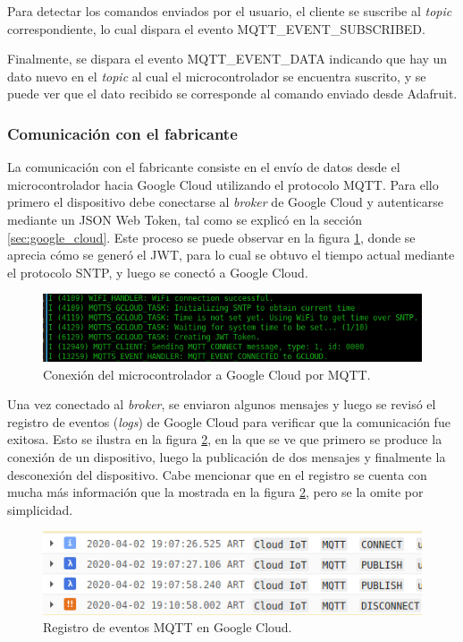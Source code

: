 Para detectar los comandos enviados por el usuario, el cliente se suscribe al \emph{topic} correspondiente, lo cual dispara el evento MQTT\_EVENT\_SUBSCRIBED.

Finalmente, se dispara el evento MQTT\_EVENT\_DATA indicando que hay un dato nuevo en el \emph{topic} al cual el microcontrolador se encuentra suscrito, y se puede ver que el dato recibido se corresponde al comando enviado desde Adafruit.

\subsubsection{Comunicación con el fabricante}

La comunicación con el fabricante consiste en el envío de datos desde el microcontrolador hacia Google Cloud utilizando el protocolo MQTT. Para ello primero el dispositivo debe conectarse al \emph{broker} de Google Cloud y autenticarse mediante un JSON Web Token, tal como se explicó en la sección \ref{sec:google_cloud}. Este proceso se puede observar en la figura \ref{fig:output_gcloud_connection}, donde se aprecia cómo se generó el JWT, para lo cual se obtuvo el tiempo actual mediante el protocolo SNTP, y luego se conectó a Google Cloud.

\begin{figure}[h]
\centering
\includegraphics[width=\textwidth]{./Figures/output_gcloud_connection.png}
\caption{Conexión del microcontrolador a Google Cloud por MQTT.}
\label{fig:output_gcloud_connection}
\end{figure}

Una vez conectado al \emph{broker}, se enviaron algunos mensajes y luego se revisó el registro de eventos (\emph{logs}) de Google Cloud para verificar que la comunicación fue exitosa. Esto se ilustra en la figura \ref{fig:gcloud_log}, en la que se ve que primero se produce la conexión de un dispositivo, luego la publicación de dos mensajes y finalmente la desconexión del dispositivo. Cabe mencionar que en el registro se cuenta con mucha más información que la mostrada en la figura \ref{fig:gcloud_log}, pero se la omite por simplicidad.

\begin{figure}[h]
\centering
\includegraphics[width=\textwidth]{./Figures/gcloud_log.png}
\caption{Registro de eventos MQTT en Google Cloud.}
\label{fig:gcloud_log}
\end{figure}

